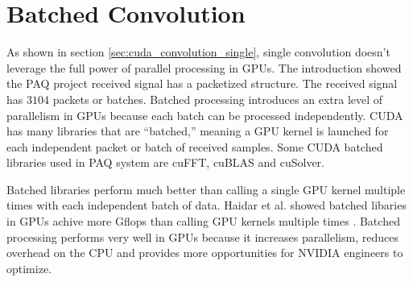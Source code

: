 \section{Batched Convolution}
As shown in section \ref{sec:cuda_convolution_single}, single convolution doesn't leverage the full power of parallel processing in GPUs.
The introduction showed the PAQ project received signal has a packetized structure.
The received signal has $3104$ packets or batches.
Batched processing introduces an extra level of parallelism in GPUs because each batch can be processed independently.
CUDA has many libraries that are ``batched,'' meaning a GPU kernel is launched for each independent packet or batch of received samples.
Some CUDA batched libraries used in PAQ system are cuFFT, cuBLAS and cuSolver.

Batched libraries perform much better than calling a single GPU kernel multiple times with each independent batch of data.
Haidar et al. showed batched libaries in GPUs achive more Gflops than calling GPU kernels multiple times \cite{haidar2015optimization}.
Batched processing performs very well in GPUs because it increases parallelism, reduces overhead on the CPU and provides more opportunities for NVIDIA engineers to optimize.

